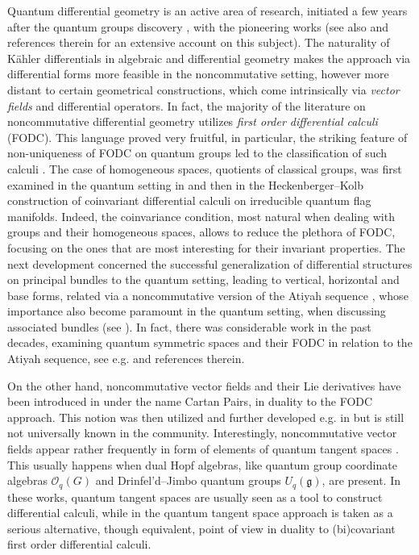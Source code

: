 \documentclass{article}
\theoremstyle{definition}
\begin{document}
	Quantum differential geometry is an active area of research, initiated a few years
	after the quantum groups discovery \cite{frt}, with the pioneering works \cite{BrzMaj, SchDC, Woronowicz1989}
	(see also \cite{bm} and references therein for an extensive account on this subject).
	The naturality of K\"ahler differentials in algebraic and differential geometry \cite{ha} makes
	the approach via differential forms more feasible in the noncommutative setting, however more distant to certain
	geometrical constructions, which come intrinsically via {\sl vector fields} and
	differential operators.
	In fact, the majority of the literature on noncommutative differential geometry utilizes {\sl first order differential calculi} (FODC).
	This language proved very fruitful, in particular, the striking feature of non-uniqueness of FODC on quantum groups led to the classification of such calculi \cite{Woronowicz1989}. 
	The case of homogeneous spaces, quotients of classical groups, was first examined in the quantum setting in \cite{herm} and then in the Heckenberger--Kolb 
	construction \cite{HeckKolb, HeckKolb2} of coinvariant differential calculi on irreducible quantum flag manifolds.
	Indeed, the coinvariance condition, most natural when dealing with groups and their homogeneous spaces, allows to reduce the plethora of FODC, focusing on the ones that are most interesting for their invariant properties. The next development concerned the successful generalization of differential structures on principal bundles to the quantum setting, leading to vertical, horizontal and base forms, related via a noncommutative version of the Atiyah sequence \cite{BrzMaj},
	whose importance also become paramount in the quantum setting, when discussing associated bundles (see \cite{baum}).
	In fact, there was considerable work in the past decades, examining quantum symmetric spaces and their FODC in relation to the Atiyah sequence, see e.g. \cite{bm,ROB2} and references therein.
	
	\medskip
	
	On the other hand, noncommutative vector fields and their Lie derivatives have been introduced in \cite{Bor96, Bor97} under the name Cartan Pairs, in duality to the FODC approach. This notion was then utilized and further developed e.g. in \cite{BMvector,bm,Bor23,fmw} but is still not universally known in the community. Interestingly, noncommutative vector fields appear rather frequently in form of elements of quantum tangent spaces \cite{paolo, AschieriSchupp,HeckKolb,HeckKolb2,Woronowicz1989}. This usually happens when dual Hopf algebras, like quantum group coordinate algebras $\mathcal{O}_q(G)$ and Drinfel'd--Jimbo quantum groups $U_q(\mathfrak{g})$, are present. In these works, quantum tangent spaces are usually seen as a tool to construct differential calculi, while in \cite{paolo, AschieriSchupp} the quantum tangent space approach is taken as a serious alternative, though equivalent, point of view in duality to (bi)covariant first order differential calculi.
	
\end{document}
